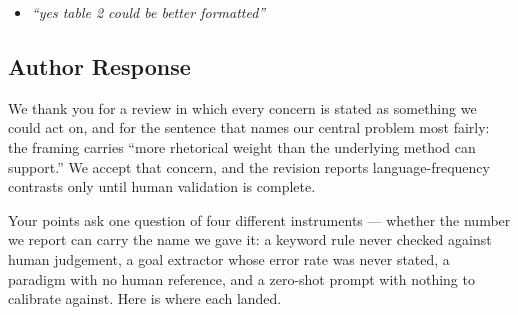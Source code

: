 \begin{itemize}
\item \textit{``yes \textperiodcentered{} table 2 could be better formatted''}
\end{itemize}

\redrule

\subsection*{\color{red!60!black}Author Response}

We thank you for a review in which every concern is stated as something we could act on, and for
the sentence that names our central problem most fairly: the framing carries ``more rhetorical
weight than the underlying method can support.'' We accept that concern, and the revision reports
language-frequency contrasts only until human validation is complete.

Your points ask one question of four different instruments --- whether the number we report can
carry the name we gave it: a keyword rule never checked against human judgement, a goal extractor
whose error rate was never stated, a paradigm with no human reference, and a zero-shot prompt with
nothing to calibrate against. Here is where each landed.


